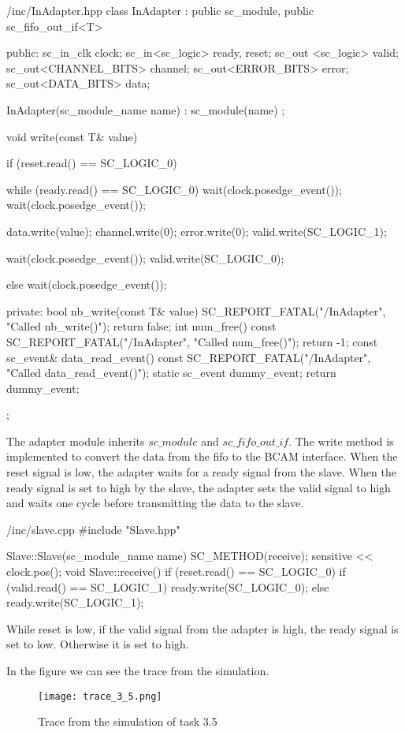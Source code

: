 \documentclass[../main.tex]{subfiles}
\begin{document}
\begin{myminted}{/inc/InAdapter.hpp}
class InAdapter : public sc_module, public sc_fifo_out_if<T> {
public:
	sc_in_clk clock;
	sc_in<sc_logic> ready, reset;
	sc_out <sc_logic> valid;
	sc_out<CHANNEL_BITS> channel;
	sc_out<ERROR_BITS> error;
	sc_out<DATA_BITS> data;

	InAdapter(sc_module_name name) : sc_module(name) {};

	void write(const T& value) {
		if (reset.read() == SC_LOGIC_0) {

			while (ready.read() == SC_LOGIC_0) {
				wait(clock.posedge_event());
			}
			wait(clock.posedge_event());

			data.write(value);
			channel.write(0);
			error.write(0);
			valid.write(SC_LOGIC_1);

			wait(clock.posedge_event());
			valid.write(SC_LOGIC_0);
		} else {
			wait(clock.posedge_event());
		}
	}
private:
	bool nb_write(const T& value) {
		SC_REPORT_FATAL("/InAdapter", "Called nb_write()");
		return false;
	}
	int num_free() const {
		SC_REPORT_FATAL("/InAdapter", "Called num_free()");
		return -1;
	}
	const sc_event& data_read_event() const {
		SC_REPORT_FATAL("/InAdapter", "Called data_read_event()");
		static sc_event dummy_event;
		return dummy_event;
	}
};
\end{myminted}

\newpage

The adapter module inherits $sc\_module$ and $sc\_fifo\_out\_if$. The write method is implemented to convert the data from the fifo to the BCAM interface. 
When the reset signal is low, the adapter waits for a ready signal from the slave. When the ready signal is set to high by the slave, the adapter sets the valid signal to high and waits one cycle before transmitting the data to the slave.

\begin{myminted}{/inc/slave.cpp}
#include "Slave.hpp"

Slave::Slave(sc_module_name name)
{
	SC_METHOD(receive);
	sensitive << clock.pos();
}
void Slave::receive()
{
	if (reset.read() == SC_LOGIC_0) {
		if (valid.read() == SC_LOGIC_1) {
			ready.write(SC_LOGIC_0);
		} else {
			ready.write(SC_LOGIC_1);
		}
	}
}
\end{myminted}
While reset is low, if the valid signal from the adapter is high, the ready signal is set to low. Otherwise it is set to high.

In the figure we can see the trace from the simulation. 

\begin{figure}[h]
    \centering
    \texttt{[image: trace\_3\_5.png]}
    \caption{Trace from the simulation of task 3.5}
\end{figure}
\end{document}
